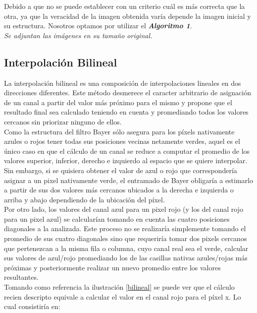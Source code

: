 \documentclass[a4paper]{article}
\begin{document}
Debido a que no se puede establecer con un criterio cu\'al es m\'as correcta que la otra, ya que la veracidad de la imagen obtenida var\'ia depende la imagen inicial y su estructura. Nosotros optamos por utilizar el \emph{\textbf{Algoritmo 1}}.\\

\textit{Se adjuntan las im\'agenes en su tama\~no original.}

\newpage
\subsection{Interpolaci\'on Bilineal}

La interpolación bilineal es una composición de interpolaciones lineales en dos direcciones diferentes. Este método desmerece el caracter arbitrario de asignación de un canal a partir del valor más próximo para el mismo y propone que el resultado final sea calculado teniendo en cuenta y promediando todos los valores cercanos sin priorizar ninguno de ellos. \\

Como la estructura del filtro Bayer sólo asegura para los p\'ixels nativamente azules o rojos tener todas sus posiciones vecinas netamente verdes, aquel es el único caso en que el cálculo de un canal se reduce a computar el promedio de los valores superior, inferior, derecho e izquierdo al espacio que se quiere interpolar.\\

Sin embargo, si se quisiera obtener el valor de azul o rojo que correspondería asignar a un pixel nativamente verde, el entramado de Bayer obligaría a estimarlo a partir de sus dos valores m\'as cercanos ubicados a la derecha e izquierda o arriba y abajo dependiendo de la ubicaci\'on del p\'ixel. \\

Por otro lado, los valores del canal azul para un pixel rojo (y los del canal rojo para un pixel azul) se calcularían tomando en cuenta las cuatro posiciones diagonales a la analizada. Este proceso no se realizar\'ia simplemente tomando el promedio de sus cuatro diagonales sino que requeriría tomar dos pixels cercanos que pertenezcan a la misma fila o columna, cuyo canal real sea el verde, calcular sus valores de azul/rojo promediando los de las casillas nativas azules/rojas más próximas y posteriormente realizar un nuevo promedio entre los valores resultantes.\\

Tomando como referencia la ilustración \ref{bilineal} se puede ver que el cálculo recien descripto equivale a calcular el valor en el canal rojo para el p\'ixel x. Lo cual consistir\'ia en: 
\end{document}
